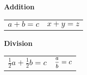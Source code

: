 \documentclass[12pt]{article}
\begin{document}
\null\vspace{20pt}
%
%
\begin{minipage}[t]{.5\textwidth}
\textbf{Addition} \\[8pt]
	\begin{tabular}{p{3cm} p{6cm}}
	$a + b = c$ & $x + y = z$ \\[6pt]
	
	\end{tabular}
\end{minipage}
%
%
\vspace{12pt}
\begin{minipage}[t]{.5\textwidth}
\textbf{Division} \\[6pt]
	\begin{tabular}{p{3cm} p{6cm}}
	$\frac{1}{2}a + \frac{1}{2}b = c$ & $\mfrac{a}{b} = c$ \\[6pt]
	\end{tabular}
\end{minipage}
\end{document}

